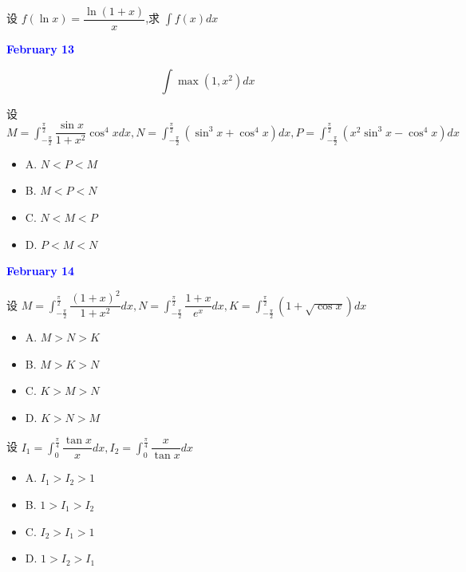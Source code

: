 \begin{example}[][Exam: 28.2.10]
	设 $f(\ln x)=\dfrac{\ln(1+x)}{x}$,求 $\int f(x)dx$
\end{example}

\textcolor{blue}{\textbf{February 13}}

\begin{example}[][Exam: 28.2.11]
	$$\int \max(1,x^{2})dx$$
\end{example}

\begin{example}[][Exam: 28.2.12]
	设 $M=\int_{-\frac{\pi}{2}}^{\frac{\pi}{2}}\dfrac{\sin x}{1+x^{2}}\cos^{4}xdx,N=\int_{-\frac{\pi}{2}}^{\frac{\pi}{2}}(\sin^{3}x+\cos^{4}x)dx,P=\int_{-\frac{\pi}{2}}^{\frac{\pi}{2}}(x^{2}\sin^{3}x-\cos^{4}x)dx$
\begin{itemize}
	\item A. $N<P<M$
	\item B. $M<P<N$
	\item C. $N<M<P$
	\item D. $P<M<N$
\end{itemize}
\end{example}

\textcolor{blue}{\textbf{February 14}}

\begin{example}[][Exam: 28.2.13]
	设 $M=\int_{-\frac{\pi}{2}}^{\frac{\pi}{2}}\dfrac{(1+x)^{2}}{1+x^{2}}dx,N=\int_{-\frac{\pi}{2}}^{\frac{\pi}{2}}\dfrac{1+x}{e^{x}}dx,K=\int_{-\frac{\pi}{2}}^{\frac{\pi}{2}}(1+\sqrt{\cos x})dx$
\begin{itemize}
	\item A. $M>N>K$
	\item B. $M>K>N$
	\item C. $K>M>N$
	\item D. $K>N>M$
\end{itemize}
\end{example}

\begin{example}[][Exam: 28.2.14]
	设 $I_{1}=\int_{0}^{\frac{\pi}{4}}\dfrac{\tan x}{x}dx,I_{2}=\int_{0}^{\frac{\pi}{4}}\dfrac{x}{\tan x}dx$
\begin{itemize}
	\item A. $I_{1}>I_{2}>1$
	\item B. $1>I_{1}>I_{2}$
	\item C. $I_{2}>I_{1}>1$
	\item D. $1>I_{2}>I_{1}$
\end{itemize}
\end{example}

